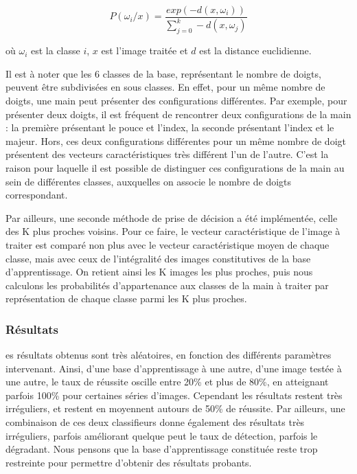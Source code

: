 \[
P(\omega_i / x) = \frac{exp(-d(x, \omega_i))}{\sum_{j=0}^{k}-d(x, \omega_j)}
\]

où $\omega_i$ est la classe $i$, $x$ est l'image traitée et $d$ est la distance euclidienne.

Il est à noter que les 6 classes de la base, représentant le nombre de doigts, peuvent être subdivisées en sous classes. En effet, pour un même nombre de doigts, une main peut présenter des configurations différentes. Par exemple, pour présenter deux doigts, il est fréquent de rencontrer deux configurations de la main : la première présentant le pouce et l'index, la seconde présentant l'index et le majeur. Hors, ces deux configurations différentes pour un même nombre de doigt présentent des vecteurs caractéristiques très différent l'un de l'autre. C'est la raison pour laquelle il est possible de distinguer ces configurations de la main au sein de différentes classes, auxquelles on associe le nombre de doigts correspondant.

	Par ailleurs, une seconde méthode de prise de décision a été implémentée, celle des K plus proches voisins. Pour ce faire, le vecteur caractéristique de l'image à traiter est comparé non plus avec le vecteur caractéristique moyen de chaque classe, mais avec ceux de l'intégralité des images constitutives de la base d'apprentissage. On retient ainsi les K images les plus proches, puis nous calculons les probabilités d'appartenance aux classes de la main à traiter par représentation de chaque classe parmi les K plus proches.

\subsubsection{Résultats}

es résultats obtenus sont très aléatoires, en fonction des différents paramètres intervenant. Ainsi, d'une base d'apprentissage à une autre, d'une image testée à une autre, le taux de réussite oscille entre 20\% et plus de 80\%, en atteignant parfois 100\% pour certaines séries d'images. Cependant les résultats restent très irréguliers, et restent en moyennent autours de 50\% de réussite. Par ailleurs, une combinaison de ces deux classifieurs donne également des résultats très irréguliers, parfois améliorant quelque peut le taux de détection, parfois le dégradant. Nous pensons que la base d'apprentissage constituée reste trop restreinte pour permettre d'obtenir des résultats probants. 

